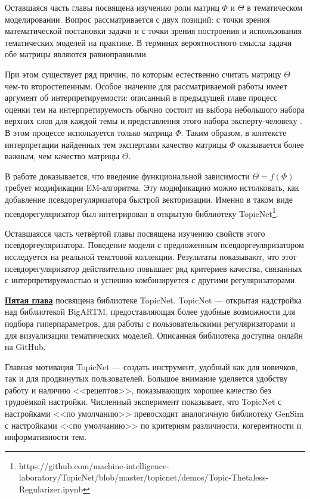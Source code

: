 Оставшаяся часть главы посвящена изучению роли матриц $\Phi$ и $\Theta$ в тематическом моделировании. Вопрос рассматривается с двух позиций: с точки зрения математической постановки задачи и с точки зрения построения и использования тематических моделей на практике. В терминах вероятностного смысла задачи обе матрицы являются равноправными.

При этом существует ряд причин, по которым естественно считать матрицу $\Theta$ чем-то второстепенным. Особое значение для рассматриваемой работы имеет аргумент об интерпретируемости: описанный в предыдущей главе процесс оценки тем на интерпретируемость обычно состоит из выбора небольшого набора верхних слов для каждой темы и представления этого набора эксперту-человеку \cite{roder2015exploring}. В этом процессе используется только матрица $\Phi$. Таким образом, в контексте интерпретации найденных тем экспертами качество матрицы $\Phi$ оказывается более важным, чем качество матрицы $\Theta$.

В работе \cite{thetaless} доказывается, что введение функциональной зависимости $\Theta = f(\Phi)$ требует модификации EM-алгоритма. Эту модификацию можно истолковать, как добавление псевдорегуляризатора быстрой векторизации. Именно в таком виде псевдорегуляризатор был интегрирован в открытую библиотеку TopicNet\footnote{https://github.com/machine-intelligence-laboratory/TopicNet/blob/master/topicnet/demos/Topic-Thetaless-Regularizer.ipynb}. 

Оставшаясся часть четвёртой главы посвящена изучению свойств этого псевдоргеуляризатора. Поведение модели с предложенным псевдоргеуляризатором исследуется на реальной текстовой коллекции. Результаты показывают, что этот псевдорегуляризатор действительно повышает ряд критериев качества, связанных с интерпретируемостью и успешно комбинируется с другими регуляризаторами.

\underline{\textbf{Пятая глава}} посвящена библиотеке TopicNet. TopicNet --- открытая надстройка над библиотекой BigARTM, предоставляющая более удобные
возможности для подбора гиперпараметров, для работы с пользовательскими
регуляризаторами и для визуализации тематических моделей. Описанная библиотека доступна онлайн на GitHub.

Главная мотивация TopicNet --- создать инструмент, удобный как для новичков, так и для продвинутых пользователей. Большое внимание уделяется удобству работу и наличию <<рецептов>>, показывающих хорошее качество без трудоёмкой настройки. Численный эксперимент показывает, что TopicNet с настройками <<по умолчанию>> превосходит аналогичную библиотеку GenSim с настройками <<по умолчанию>> по критериям различности, когерентности и информативности тем.

